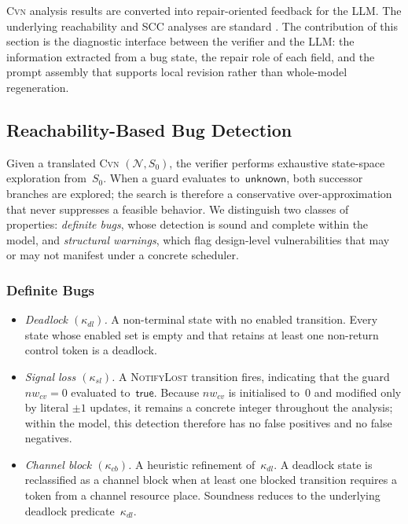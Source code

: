 \documentclass[sigconf]{acmart}
\begin{document}
\textsc{Cvn} analysis results are converted into repair-oriented feedback for the LLM\@. The underlying reachability and SCC analyses are standard \cite{Godefroid1997VeriSoft,Flanagan2005DPOR, Musuvathi2008FairStateless,Esparza2008Unfoldings}.
The contribution of this section is the diagnostic interface between the verifier and the LLM: the information
extracted from a bug state, the repair role of each field, and the prompt assembly that supports local revision rather than whole-model regeneration.


\subsection{Reachability-Based Bug Detection}
\label{subsec:bug-patterns}

Given a translated \textsc{Cvn} $(\mathcal{N},S_0)$, the verifier performs exhaustive state-space exploration from~$S_0$. When a guard evaluates to~$\mathsf{unknown}$, both successor branches are explored; the search is therefore a conservative
over-approximation that never suppresses a feasible behavior. We distinguish two classes of properties: \emph{definite bugs},
whose detection is sound and complete within the model, and \emph{structural warnings}, which flag design-level vulnerabilities that may or may not manifest under a concrete scheduler.

\subsubsection{Definite Bugs}

\begin{itemize}[leftmargin=1.5em]
  \item \emph{Deadlock\/ $(\kappa_{dl})$.}\;
    A non-terminal state with no enabled transition. Every state whose enabled set is empty and that retains at least one non-return control token is a deadlock.

  \item \emph{Signal loss\/ $(\kappa_{sl})$.}\;
    A \textsc{NotifyLost} transition fires, indicating that the guard $nw_{\mathit{cv}}=0$ evaluated to~$\mathsf{true}$.   Because $nw_{\mathit{cv}}$ is initialised to~$0$ and modified only by literal $\pm 1$ updates, it remains a concrete integer throughout the analysis; within the model, this detection therefore has no false positives and no false negatives.

  \item \emph{Channel block\/ $(\kappa_{cb})$.}\;
    A heuristic refinement of~$\kappa_{dl}$. A deadlock state is reclassified as a channel block when at least one blocked transition requires a token from a channel resource place. Soundness reduces to the underlying deadlock predicate~$\kappa_{dl}$.
\end{itemize}
\end{document}

